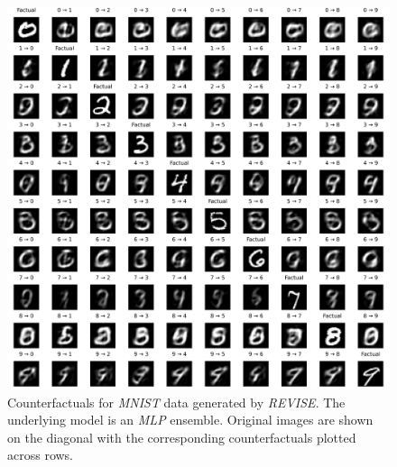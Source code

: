 \begin{figure}
  \centering
  \includegraphics[width=1.0\linewidth]{../www/mnist_all_mlp_ens_revise.png}
  \caption{Counterfactuals for \textit{MNIST} data generated by \textit{REVISE}. The underlying model is an \textit{MLP} ensemble. Original images are shown on the diagonal with the corresponding counterfactuals plotted across rows.}\label{fig:mnist-revise-mlp-ens}
\end{figure}

